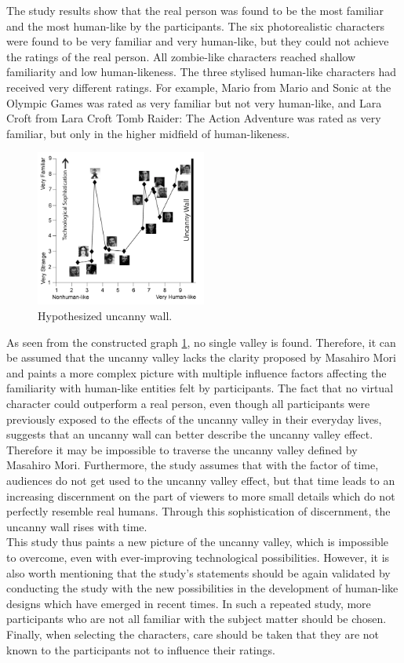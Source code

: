 The study results show that the real person was found to be the most familiar and the most human-like by the participants. The six photorealistic characters were found to be very familiar and very human-like, but they could not achieve the ratings of the real person. All zombie-like characters reached shallow familiarity and low human-likeness. 
The three stylised human-like characters had received very different ratings. For example, Mario from Mario and Sonic at the Olympic Games was rated as very familiar but not very human-like, and Lara Croft from Lara Croft Tomb Raider: The Action Adventure was rated as very familiar, but only in the higher midfield of human-likeness. 
\newpage
\begin{figure} %
    \centering
    \includegraphics[width=0.5\textwidth]{graphics/uncanny_wall_graph.png}
    \caption{Hypothesized uncanny wall.}
    \label{fig:uncannyWallGraph}
\end{figure}
As seen from the constructed graph \ref{fig:uncannyWallGraph}, no single valley is found.
Therefore, it can be assumed that the uncanny valley lacks the clarity proposed by Masahiro Mori and paints a more complex picture with multiple influence factors affecting the familiarity with human-like entities felt by participants. The fact that no virtual character could outperform a real person, even though all participants were previously exposed to the effects of the uncanny valley in their everyday lives, suggests that an uncanny wall can better describe the uncanny valley effect. Therefore it may be impossible to traverse the uncanny valley defined by Masahiro Mori. Furthermore, the study assumes that with the factor of time, audiences do not get used to the uncanny valley effect, but that time leads to an increasing discernment on the part of viewers to more small details which do not perfectly resemble real humans. Through this sophistication of discernment, the uncanny wall rises with time.\\
This study thus paints a new picture of the uncanny valley, which is impossible to overcome, even with ever-improving technological possibilities. However, it is also worth mentioning that the study's statements should be again validated by conducting the study with the new possibilities in the development of human-like designs which have emerged in recent times. In such a repeated study, more participants who are not all familiar with the subject matter should be chosen. Finally, when selecting the characters, care should be taken that they are not known to the participants not to influence their ratings.